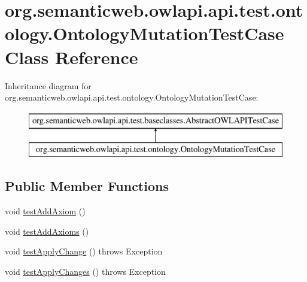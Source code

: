 \hypertarget{classorg_1_1semanticweb_1_1owlapi_1_1api_1_1test_1_1ontology_1_1_ontology_mutation_test_case}{\section{org.\-semanticweb.\-owlapi.\-api.\-test.\-ontology.\-Ontology\-Mutation\-Test\-Case Class Reference}
\label{classorg_1_1semanticweb_1_1owlapi_1_1api_1_1test_1_1ontology_1_1_ontology_mutation_test_case}
}
Inheritance diagram for org.\-semanticweb.\-owlapi.\-api.\-test.\-ontology.\-Ontology\-Mutation\-Test\-Case\-:\begin{figure}[H]
\begin{center}
\leavevmode
\includegraphics[height=2.000000cm]{classorg_1_1semanticweb_1_1owlapi_1_1api_1_1test_1_1ontology_1_1_ontology_mutation_test_case}
\end{center}
\end{figure}
\subsection*{Public Member Functions}
\begin{DoxyCompactItemize}
\item 
void \hyperlink{classorg_1_1semanticweb_1_1owlapi_1_1api_1_1test_1_1ontology_1_1_ontology_mutation_test_case_a6520dc5ceb3ad607efeb84b3b00ab8b4}{test\-Add\-Axiom} ()
\item 
void \hyperlink{classorg_1_1semanticweb_1_1owlapi_1_1api_1_1test_1_1ontology_1_1_ontology_mutation_test_case_a59649dad1d8327401bb843f2e4367673}{test\-Add\-Axioms} ()
\item 
void \hyperlink{classorg_1_1semanticweb_1_1owlapi_1_1api_1_1test_1_1ontology_1_1_ontology_mutation_test_case_a23b76364086b15d990bba0ece958071a}{test\-Apply\-Change} ()  throws Exception 
\item 
void \hyperlink{classorg_1_1semanticweb_1_1owlapi_1_1api_1_1test_1_1ontology_1_1_ontology_mutation_test_case_abcd739abf238dfaa8c80f3aa07ae5444}{test\-Apply\-Changes} ()  throws Exception 
\end{DoxyCompactItemize}
